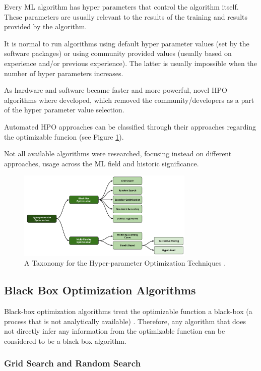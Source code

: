 \documentclass[runningheads]{llncs}
\begin{document}
Every ML algorithm has hyper parameters that control the algorithm itself. These parameters are usually relevant to the results of the training and results provided by the algorithm.

It is normal to run algorithms using default hyper parameter values (set by the software packages) or using community provided values (usually based on experience and/or previous experience). The latter is usually impossible when the number of hyper parameters increases.

As hardware and software became faster and more powerful, novel HPO algorithms where developed, which removed the community/developers as a part of the hyper parameter value selection.

Automated HPO approaches can be classified through their approaches regarding the optimizable funcion (see Figure \ref{fig:state_of_art_taxonomy}).

Not all available algorithms were researched, focusing instead on different approaches, usage across the ML field and historic significance.

\begin{figure}
	\centering
	\includegraphics[width=0.75\textwidth]{images/state_art-taxonomy_optimizers.png}
	\caption{A Taxonomy for the Hyper-parameter Optimization Techniques \cite{elshawi2019automated}.}
	\label{fig:state_of_art_taxonomy}
\end{figure}

\subsection{Black Box Optimization Algorithms}

Black-box optimization algorithms treat the optimizable function a black-box (a process that is not analytically available) \cite[ch.~1]{book}. Therefore, any algorithm that does not directly infer any information from the optimizable function can be considered to be a black box algorithm.

\subsubsection{Grid Search and Random Search}
\end{document}
